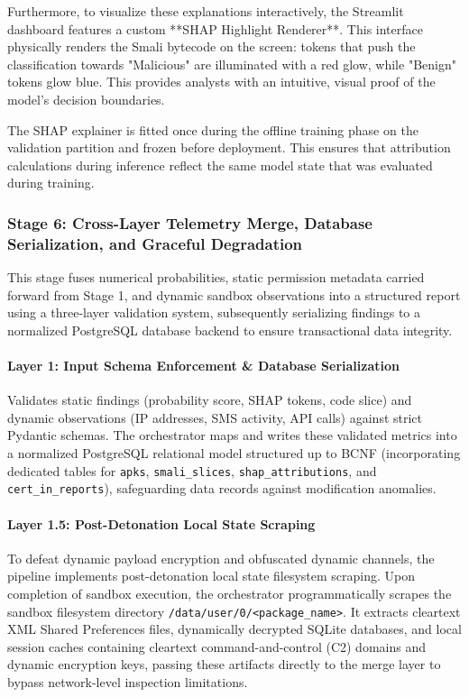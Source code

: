 \documentclass[10pt,a4paper]{article}
\begin{document}
Furthermore, to visualize these explanations interactively, the Streamlit dashboard features a custom **SHAP Highlight Renderer**. This interface physically renders the Smali bytecode on the screen: tokens that push the classification towards "Malicious" are illuminated with a red glow, while "Benign" tokens glow blue. This provides analysts with an intuitive, visual proof of the model's decision boundaries.

The SHAP explainer is fitted once during the offline training phase on the validation partition and frozen before deployment. This ensures that attribution calculations during inference reflect the same model state that was evaluated during training.

\subsubsection*{Stage 6: Cross-Layer Telemetry Merge, Database Serialization, and Graceful Degradation}

This stage fuses numerical probabilities, static permission metadata carried forward from Stage 1, and dynamic sandbox observations into a structured report using a three-layer validation system, subsequently serializing findings to a normalized PostgreSQL database backend to ensure transactional data integrity.

\paragraph{Layer 1: Input Schema Enforcement \& Database Serialization}
Validates static findings (probability score, SHAP tokens, code slice) and dynamic observations (IP addresses, SMS activity, API calls) against strict Pydantic schemas. The orchestrator maps and writes these validated metrics into a normalized PostgreSQL relational model structured up to BCNF (incorporating dedicated tables for \texttt{apks}, \texttt{smali\_slices}, \texttt{shap\_attributions}, and \texttt{cert\_in\_reports}), safeguarding data records against modification anomalies.

\paragraph{Layer 1.5: Post-Detonation Local State Scraping}
To defeat dynamic payload encryption and obfuscated dynamic channels, the pipeline implements post-detonation local state filesystem scraping. Upon completion of sandbox execution, the orchestrator programmatically scrapes the sandbox filesystem directory \texttt{/data/user/0/<package\_name>}. It extracts cleartext XML Shared Preferences files, dynamically decrypted SQLite databases, and local session caches containing cleartext command-and-control (C2) domains and dynamic encryption keys, passing these artifacts directly to the merge layer to bypass network-level inspection limitations.
\end{document}
